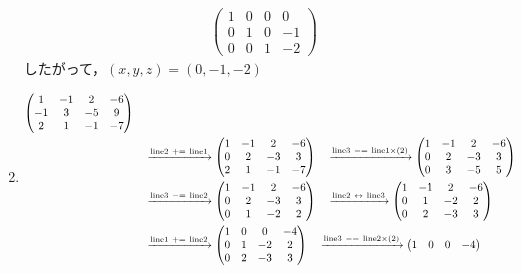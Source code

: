 \documentclass{ltjsarticle}
\begin{document}
\begin{enumerate}
\begin{align*}
\begin{pmatrix}
 1 & 0 & 0 & 0\\
 0 & 1 & 0 & -1\\
 0 & 0 & 1 & - 2
\end{pmatrix}
\end{align*}
したがって，$(x, y, z)=(0, -1, -2)$
\item
\begin{align*}
\begin{pmatrix}
 1 & -1 & 2 & - 6\\
 -1 & 3 & - 5 & 9\\
 2 & 1 & -1 & - 7
\end{pmatrix}\allowdisplaybreaks\\
&\ \ \ \xrightarrow{ \text{line} 2 \ +=\  \text{line} 1 } %
\begin{pmatrix}
 1 & -1 & 2 & - 6\\
 0 & 2 & - 3 & 3\\
 2 & 1 & -1 & - 7
\end{pmatrix}\ \ \ \xrightarrow{ \text{line} 3 \ -=\  \text{line} 1 \times\left( 2 \right)} %
\begin{pmatrix}
 1 & -1 & 2 & - 6\\
 0 & 2 & - 3 & 3\\
 0 & 3 & - 5 & 5
\end{pmatrix}\allowdisplaybreaks\\
 &\ \ \ \xrightarrow{ \text{line} 3 \ -=\  \text{line} 2 } %
\begin{pmatrix}
 1 & -1 & 2 & - 6\\
 0 & 2 & - 3 & 3\\
 0 & 1 & - 2 & 2
\end{pmatrix}\ \ \ \xrightarrow{ \text{line} 2 \ \leftrightarrow\  \text{line} 3 } %
\begin{pmatrix}
 1 & -1 & 2 & - 6\\
 0 & 1 & - 2 & 2\\
 0 & 2 & - 3 & 3
\end{pmatrix}\allowdisplaybreaks\\
 &\ \ \ \xrightarrow{ \text{line} 1 \ +=\  \text{line} 2 } %
\begin{pmatrix}
 1 & 0 & 0 & - 4\\
 0 & 1 & - 2 & 2\\
 0 & 2 & - 3 & 3
\end{pmatrix}\ \ \ \xrightarrow{ \text{line} 3 \ -=\  \text{line} 2 \times\left( 2 \right)} %
\begin{pmatrix}
 1 & 0 & 0 & - 4\\

\end{pmatrix}
\end{align*}
\end{enumerate}
\end{document}
